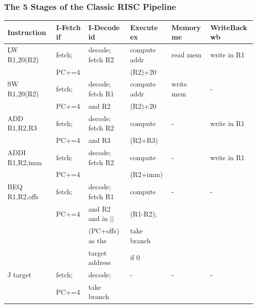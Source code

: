 \documentclass{beamer}
\begin{document}
\begin{frame}[fragile,t]
\frametitle{The 5 Stages of the Classic RISC Pipeline}

\begin{tiny}
\begin{tabular}{llllll}
\hline
Instruction   & I-Fetch {\sc if} & I-Decode {\sc id} & Execute {\sc ex} & Memory {\sc me} & WriteBack {\sc wb} \\\hline
LW R1,20(R2)  & fetch;       & decode; fetch R2 & compute addr & read mem    & write in R1    \\
              & PC+=4        &                  & (R2)+20 &             &                \\\hline
SW R1,20(R2)  & fetch;       & decode; fetch R1 & compute addr & write mem   & -              \\
              & PC+=4        & and R2           & (R2)+20 &             &                \\\hline
ADD R1,R2,R3  & fetch;       & decode; fetch R2 & compute      & -           & write in R1    \\
              & PC+=4        & and R3           & (R2+R3)      &             &                \\\hline
ADDI R1,R2,imm& fetch;       & decode; fetch R2 & compute      & -           & write in R1    \\
              & PC+=4        &                  & (R2+imm)     &             &                \\\hline
BEQ R1,R2,offs& fetch;       & decode; fetch R1 & compute      & -           & -              \\
              & PC+=4        & and R2 and in $||$ & (R1-R2);     &             &                \\
              &              & (PC+offs) as the & take branch  &             &                \\
              &              & target address   & if 0         &             &                \\\hline
J target      & fetch;       & decode;          & -            & -           & -              \\
              & PC+=4        & take branch      &              &             &                \\\hline
\end{tabular}
\end{tiny} 


\end{frame}
\end{document}
